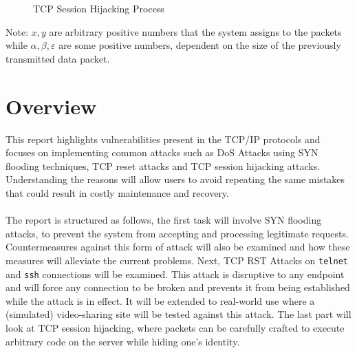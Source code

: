 \documentclass[a4paper,12pt]{article}
\begin{document}
\begin{figure}[H]
	\caption{TCP Session Hijacking Process}
	\label{fig:SessionHijacking}
\end{figure}
\noindent Note: $x,y$ are arbitrary positive numbers that the system assigns to the packets while $\alpha,\beta,\varepsilon$ are some positive numbers, dependent on the size of the previously transmitted data packet.
	\section{Overview}
	\begin{par}
		This report highlights vulnerabilities present in the TCP/IP protocols and focuses on implementing common attacks such as DoS Attacks using SYN flooding techniques, TCP reset attacks and TCP session hijacking attacks. Understanding the reasons will allow users to avoid repeating the same mistakes that could result in costly maintenance and recovery.\\\\The report is structured as follows, the first task will involve SYN flooding attacks, to prevent the system from accepting and processing legitimate requests. Countermeasures against this form of attack will also be examined and how these measures will alleviate the current problems. Next, TCP RST Attacks on \texttt{telnet} and \texttt{ssh} connections will be examined. This attack is disruptive to any endpoint and will force any connection to be broken and prevents it from being established while the attack is in effect. It will be extended to real-world use where a (simulated) video-sharing site will be tested against this attack. The last part will look at TCP session hijacking, where packets can be carefully crafted to execute arbitrary code on the server while hiding one's identity.
		\end{par}
\end{document}

